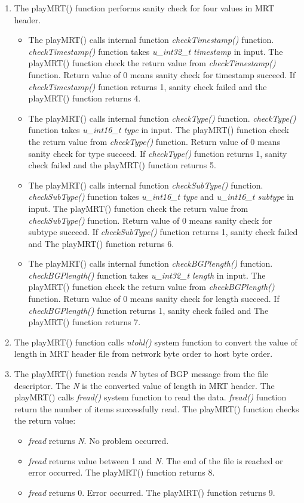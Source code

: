 \begin{enumerate}
\begin{enumerate}
  \item{The playMRT() function performs sanity check for four values in MRT header.}
  \begin{itemize}
    \item{The playMRT() calls internal function \emph{checkTimestamp()} function.  \emph{checkTimestamp()} function takes \emph{ u\_int32\_t timestamp} in input. The  playMRT() function check the return value from \emph{checkTimestamp()} function. Return value of  0  means sanity check for timestamp succeed. If \emph{checkTimestamp()} function returns 1, sanity check failed and the  playMRT() function returns 4. }
    \item{The  playMRT() calls internal function \emph{checkType()} function.  \emph{checkType()} function takes \emph{u\_int16\_t type} in input. The  playMRT() function check the return value from \emph{checkType()} function. Return value of  0  means sanity check for type succeed. If \emph{checkType()} function returns 1, sanity check failed and the  playMRT() function returns 5. }
     \item{The  playMRT() calls internal function \emph{checkSubType()} function.  \emph{checkSubType()} function takes \emph{u\_int16\_t type} and \emph{u\_int16\_t subtype} in input. The  playMRT() function check the return value from \emph{checkSubType()} function. Return value of  0  means sanity check for subtype succeed. If \emph{checkSubType()} function returns 1, sanity check failed and The  playMRT() function returns 6. }
     \item{The  playMRT() calls internal function \emph{checkBGPlength()} function.  \emph{checkBGPlength()} function takes \emph{u\_int32\_t length} in input. The  playMRT() function check the return value from \emph{checkBGPlength()} function. Return value of  0  means sanity check for length succeed. If \emph{checkBGPlength()} function returns 1, sanity check failed and The  playMRT() function returns 7. }
  \end{itemize}
  
  \item{The  playMRT() function  calls \emph{ntohl()} system function to convert the value of length in MRT header file from  network byte order to host byte order.  }
  \item{The  playMRT() function reads \emph{N} bytes of BGP message from the file descriptor.  The \emph{N}  is the converted value of length in MRT header.   The  playMRT() calls \emph{fread()} system function to read the data. \emph{fread()} function return the number of items successfully read. The  playMRT() function checks the return value:  }
  \begin{itemize}
  \item{\emph{fread} returns \emph{N}.  No problem occurred. }
  \item{\emph{fread} returns value between 1 and \emph{N}. The end of the file is reached or error occurred. The  playMRT() function returns 8.}
  \item{\emph{fread} returns 0. Error occurred. The  playMRT() function returns 9.}
  \end{itemize}
  

\end{enumerate}
\end{enumerate}
